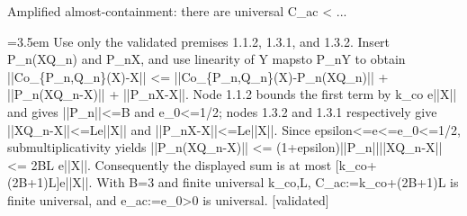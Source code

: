 \documentclass{article}
\newcommand{\step}[1]{\par\noindent\hangindent=3.5em\hangafter=1%
  \makebox[3.5em][l]{\textbf{#1.}}}
\newcommand{\steptag}[1]{\hfill{\small\textsf{[#1]}}}
\begin{document}
\begin{proofbox}{Amplified almost-containment: there are universal C\_ac < ...}
\step{1.4.1.1} Use only the validated premises 1.1.2, 1.3.1, and 1.3.2. Insert P\_n(XQ\_n) and P\_nX, and use linearity of Y mapsto P\_nY to obtain ||Co\_\{P\_n,Q\_n\}(X)-X|| <= ||Co\_\{P\_n,Q\_n\}(X)-P\_n(XQ\_n)|| + ||P\_n(XQ\_n-X)|| + ||P\_nX-X||. Node 1.1.2 bounds the first term by k\_co e||X|| and gives ||P\_n||<=B and e\_0<=1/2; nodes 1.3.2 and 1.3.1 respectively give ||XQ\_n-X||<=Le||X|| and ||P\_nX-X||<=Le||X||. Since epsilon<=e<=e\_0<=1/2, submultiplicativity yields ||P\_n(XQ\_n-X)|| <= (1+epsilon)||P\_n||||XQ\_n-X|| <= 2BL e||X||. Consequently the displayed sum is at most [k\_co+(2B+1)L]e||X||. With B=3 and finite universal k\_co,L, C\_ac:=k\_co+(2B+1)L is finite universal, and e\_ac:=e\_0>0 is universal. \steptag{validated} \\[4pt]
\end{proofbox}
\end{document}
